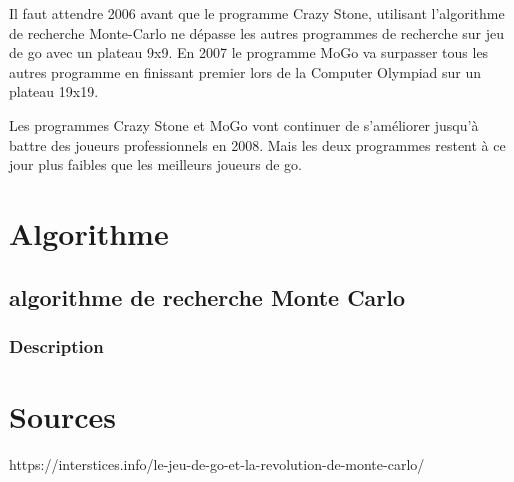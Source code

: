 \documentclass[12pt]{article}
\begin{document}
Il faut attendre 2006 avant que le programme Crazy Stone, utilisant l'algorithme de recherche Monte-Carlo ne dépasse les autres programmes de recherche sur jeu de go avec un plateau 9x9. En 2007 le programme MoGo va surpasser tous les autres programme en finissant premier lors de la Computer Olympiad sur un plateau 19x19.


Les programmes Crazy Stone et MoGo vont continuer de s'améliorer jusqu'à battre des joueurs professionnels en 2008. Mais les deux programmes restent à ce jour plus faibles que les meilleurs joueurs de go.


\section{Algorithme}

	\subsection{algorithme de recherche Monte Carlo}
	
		\subsubsection{Description}
		
\section{Sources}

https://interstices.info/le-jeu-de-go-et-la-revolution-de-monte-carlo/

		
\end{document}
